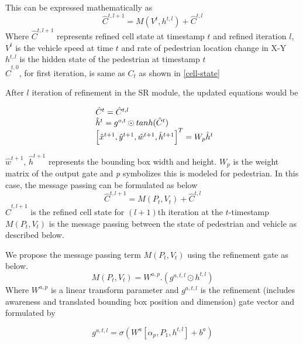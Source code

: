 %
This can be expressed mathematically as
\begin{equation}
\hat{C}^{t, l+1}= M(V^t, {h}^{t, l}) + \hat{C}^{t, l}
\end{equation}
Where $\hat{C}^{t, l+1}$ represents refined cell state at timestamp $t$ and refined iteration $l$, $V^t$ is the vehicle speed at time $t$ and rate of pedestrian location change in X-Y \\
${h}^{t, l}$ is the hidden state of the pedestrian at timestamp $t$ \\
$\hat{C}^{t, 0}$, for first iteration, is same as $C_t$ as shown in \ref{cell-state}

After $l$ iteration of refinement in the SR module, the updated equations would be

\begin{equation}
\begin{array}{l@{}}
\hat{C}^{t}=\hat{C}^{t, l} \\
\hat{h}^{t}={g}^{o,t} \odot tanh(\hat{C}^{t}) \\
\left[ \hat{x}^{t+1}, \hat{y}^{t+1}, \hat{w}^{t+1}, \hat{h}^{t+1} \right] ^ T = W_p\hat{h}^{t}
\end{array}
\end{equation}

$\hat{w}^{t+1}$, $\hat{h}^{t+1}$ represents the bounding box width and height.
$W_p$ is the weight matrix of the output gate and \textit{p} symbolizes this is modeled for pedestrian.
%
In this case, the message passing can be formulated as below 
\begin{equation}
\hat{C}^{t, l+1}=M(P_t, V_t) +  \hat{C}^{t, l}
\end{equation}
$\hat{C}^{t, l+1}$ is the refined cell state for $(l+1)$th iteration at the $t$-timestamp \\
$M(P_t, V_t)$ is the message passing between the state of pedestrian and vehicle as described below.

We propose the message passing term $M(P_t, V_t)$ using the refinement gate as below.
\begin{equation}
M(P_t, V_t) = W^{a,p}.(g^{a,t,l} \odot {h}^{t, l} ) 
\end{equation}
Where $W^{a,p}$ is a linear transform parameter and $g^{a,t,l}$ is the refinement (includes awareness and translated bounding box position and dimension) gate vector and formulated by

\begin{equation}
g^{a,t,l} = \sigma(W^{a} [ \alpha_p, P_1, {h}^{t, l} ] + b^{a} ) 
\end{equation}


